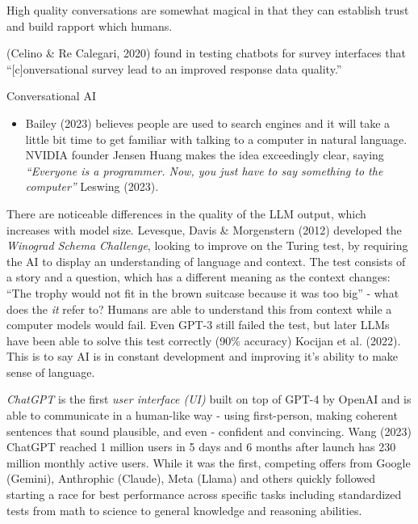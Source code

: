 \documentclass[
  letterpaper,
  DIV=11,
  numbers=noendperiod]{scrartcl}
\providecommand{\tightlist}{%
  \setlength{\itemsep}{0pt}\setlength{\parskip}{0pt}}\usepackage{longtable,booktabs,array}
\begin{document}
High quality conversations are somewhat magical in that they can
establish trust and build rapport which humans.

(Celino \& Re Calegari, 2020) found in testing chatbots for survey
interfaces that ``{[}c{]}onversational survey lead to an improved
response data quality.''

Conversational AI

\begin{itemize}
\tightlist
\item
  Bailey (2023) believes people are used to search engines and it will
  take a little bit time to get familiar with talking to a computer in
  natural language. NVIDIA founder Jensen Huang makes the idea
  exceedingly clear, saying \emph{``Everyone is a programmer. Now, you
  just have to say something to the computer''} Leswing (2023).
\end{itemize}

There are noticeable differences in the quality of the LLM output, which
increases with model size. Levesque, Davis \& Morgenstern (2012)
developed the \emph{Winograd Schema Challenge}, looking to improve on
the Turing test, by requiring the AI to display an understanding of
language and context. The test consists of a story and a question, which
has a different meaning as the context changes: ``The trophy would not
fit in the brown suitcase because it was too big'' - what does the
\emph{it} refer to? Humans are able to understand this from context
while a computer models would fail. Even GPT-3 still failed the test,
but later LLMs have been able to solve this test correctly (90\%
accuracy) Kocijan et al. (2022). This is to say AI is in constant
development and improving it's ability to make sense of language.

\emph{ChatGPT} is the first \emph{user interface (UI)} built on top of
GPT-4 by OpenAI and is able to communicate in a human-like way - using
first-person, making coherent sentences that sound plausible, and even -
confident and convincing. Wang (2023) ChatGPT reached 1 million users in
5 days and 6 months after launch has 230 million monthly active users.
While it was the first, competing offers from Google (Gemini),
Anthrophic (Claude), Meta (Llama) and others quickly followed starting a
race for best performance across specific tasks including standardized
tests from math to science to general knowledge and reasoning abilities.
\end{document}
